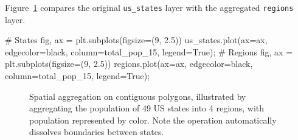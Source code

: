 \documentclass[
  letterpaper,
]{krantz}
\newenvironment{Shaded}{\begin{snugshade}}{\end{snugshade}}
\newcommand{\CommentTok}[1]{\textcolor[rgb]{0.37,0.37,0.37}{#1}}
\newcommand{\DecValTok}[1]{\textcolor[rgb]{0.68,0.00,0.00}{#1}}
\newcommand{\FloatTok}[1]{\textcolor[rgb]{0.68,0.00,0.00}{#1}}
\newcommand{\NormalTok}[1]{\textcolor[rgb]{0.00,0.23,0.31}{#1}}
\newcommand{\OperatorTok}[1]{\textcolor[rgb]{0.37,0.37,0.37}{#1}}
\newcommand{\StringTok}[1]{\textcolor[rgb]{0.13,0.47,0.30}{#1}}
\newcommand{\VariableTok}[1]{\textcolor[rgb]{0.07,0.07,0.07}{#1}}
\begin{document}
Figure~\ref{fig-dissolve} compares the original \texttt{us\_states}
layer with the aggregated \texttt{regions} layer.

\begin{Shaded}
\begin{Highlighting}[]
\CommentTok{\# States}
\NormalTok{fig, ax }\OperatorTok{=}\NormalTok{ plt.subplots(figsize}\OperatorTok{=}\NormalTok{(}\DecValTok{9}\NormalTok{, }\FloatTok{2.5}\NormalTok{))}
\NormalTok{us\_states.plot(ax}\OperatorTok{=}\NormalTok{ax, edgecolor}\OperatorTok{=}\StringTok{\textquotesingle{}black\textquotesingle{}}\NormalTok{, column}\OperatorTok{=}\StringTok{\textquotesingle{}total\_pop\_15\textquotesingle{}}\NormalTok{, legend}\OperatorTok{=}\VariableTok{True}\NormalTok{)}\OperatorTok{;}
\CommentTok{\# Regions}
\NormalTok{fig, ax }\OperatorTok{=}\NormalTok{ plt.subplots(figsize}\OperatorTok{=}\NormalTok{(}\DecValTok{9}\NormalTok{, }\FloatTok{2.5}\NormalTok{))}
\NormalTok{regions.plot(ax}\OperatorTok{=}\NormalTok{ax, edgecolor}\OperatorTok{=}\StringTok{\textquotesingle{}black\textquotesingle{}}\NormalTok{, column}\OperatorTok{=}\StringTok{\textquotesingle{}total\_pop\_15\textquotesingle{}}\NormalTok{, legend}\OperatorTok{=}\VariableTok{True}\NormalTok{)}\OperatorTok{;}
\end{Highlighting}
\end{Shaded}

\begin{figure}

\begin{minipage}{0.50\linewidth}



\end{minipage}%
%
\begin{minipage}{0.50\linewidth}



\end{minipage}%

\caption{\label{fig-dissolve}Spatial aggregation on contiguous polygons,
illustrated by aggregating the population of 49 US states into 4
regions, with population represented by color. Note the operation
automatically dissolves boundaries between states.}

\end{figure}%
\end{document}
